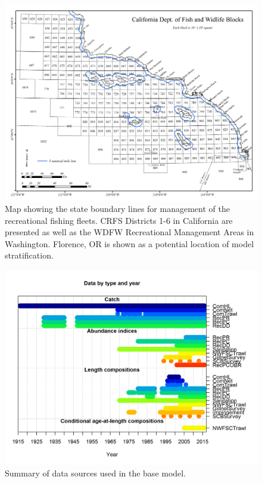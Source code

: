 \documentclass[12pt,]{article}
\begin{document}
\begin{figure}[htbp]
\centering
\includegraphics{Figures/boundary_map.png}
\caption{Map showing the state boundary lines for management of the
recreational fishing fleets. CRFS Districts 1-6 in California are
presented as well as the WDFW Recreational Management Areas in
Washington. Florence, OR is shown as a potential location of model
stratification. \label{fig:boundary_map}}
\end{figure}

\begin{figure}[htbp]
\centering
\includegraphics{r4ss/plots_mod1/data_plot.png}
\caption{Summary of data sources used in the base model.
\label{fig:data_plot}}
\end{figure}
\end{document}
